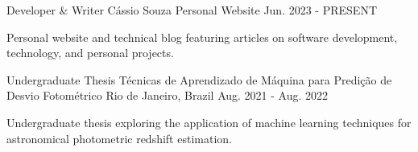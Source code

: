 

\begin{cventries}

  \cventry
    {Developer \& Writer} %
    {Cássio Souza} %
    {Personal Website} %
    {Jun. 2023 - PRESENT} %
    {
      \begin{cvitems} %
        \item {Personal website and technical blog featuring articles on software development, technology, and personal projects.}
      \end{cvitems}
    }

  \cventry
    {Undergraduate Thesis} %
    {Técnicas de Aprendizado de Máquina para Predição de Desvio Fotométrico} %
    {Rio de Janeiro, Brazil} %
    {Aug. 2021 - Aug. 2022} %
    {
      \begin{cvitems} %
        \item {Undergraduate thesis exploring the application of machine learning techniques for astronomical photometric redshift estimation.}
      \end{cvitems}
    }

\end{cventries}
